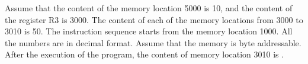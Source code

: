 \documentclass[a4paper, 11pt]{article}
\begin{document}
\begin{enumerate}
    Assume that the content of the memory location 5000 is 10, and the content of the register R3 is 3000. The content of each of the memory locations from 3000 to 3010 is 50. The instruction sequence starts from the memory location 1000. All the numbers are in decimal format. Assume that the memory is byte addressable.\\After the execution of the program, the content of memory location 3010 is \underline{\hspace{2cm}}.
    \hfill{}

\end{enumerate}
\end{document}
